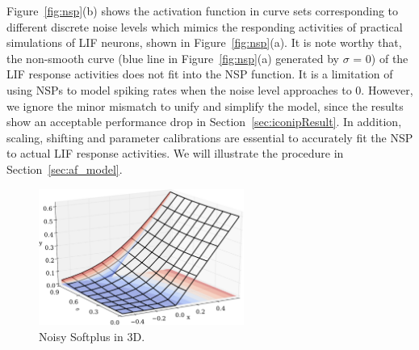 	


	
	
	Figure~\ref{fig:nsp}(b) shows the activation function in curve sets corresponding to different discrete noise levels which mimics the responding activities of practical simulations of LIF neurons, shown in Figure~\ref{fig:nsp}(a).
	It is note worthy that, the non-smooth curve (blue line in Figure~\ref{fig:nsp}(a) generated by $\sigma$ = 0) of the LIF response activities does not fit into the NSP function.
	It is a limitation of using NSPs to model spiking rates when the noise level approaches to 0.
	However, we ignore the minor mismatch to unify and simplify the model, since the results show an acceptable performance drop in Section~\ref{sec:iconipResult}.
	In addition, scaling, shifting and parameter calibrations are essential to accurately fit the NSP to actual LIF response activities.
	We will illustrate the procedure in Section~\ref{sec:af_model}.
	
	
	\begin{figure}[bt]
		\centering
		\includegraphics[width=0.6\textwidth]{pics_iconip/revise_5.pdf}
		\caption[NSP in 3D.]{Noisy Softplus in 3D.}
		\label{Fig:NSP3D}
	\end{figure}

